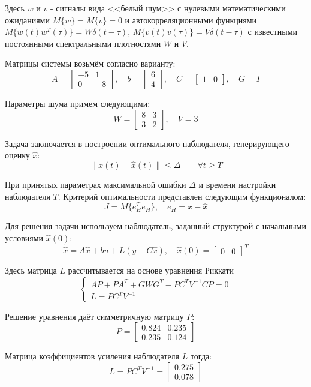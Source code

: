 \documentclass[a4paper,hidelinks,14pt]{extarticle}
\begin{document}
	Здесь $w$ и $v$ - сигналы вида <<белый шум>> с нулевыми математическими ожиданиями $M\{w\}=M\{v\}=0$ и автокорреляционными функциями $M\{w(t)w^T(\tau)\}=W\delta(t-\tau)$, $M\{v(t)v(\tau)\}=V\delta(t-\tau)$ с известными постоянными спектральными плотностями $W$ и $V$.

	Матрицы системы возьмём согласно варианту:
	\[
		A = \begin{bmatrix}
			-5 & 1 \\
			0 & -8
		\end{bmatrix}, \quad
		b = \begin{bmatrix}
			6 \\
			4
		\end{bmatrix}, \quad C = \begin{bmatrix}
			1 & 0
		\end{bmatrix}, \quad G = I
	\]

	Параметры шума примем следующими:
	\[
		W = \begin{bmatrix}
			8 & 3 \\
			3 & 2
		\end{bmatrix}, \quad V = 3
	\]

	Задача заключается в построении оптимального наблюдателя, генерирующего оценку $\hat{x}$:
	\[
	\|x(t) - \hat{x}(t)\| \le \Delta \qquad \forall t \ge T
	\]
	
	При принятых параметрах максимальной ошибки $\Delta$ и времени настройки наблюдателя $T$. Критерий оптимальности представлен следующим функционалом:
	\[
	J = M\{e_H^T e_H\}, \quad e_H = x - \hat{x}
	\]

	Для решения задачи используем наблюдатель, заданный структурой с начальными условиями $\hat{x}(0)$:
	\[
	\dot{\hat{x}} = A\hat{x} + bu + L(y - C\hat{x}), \quad \hat{x}(0) = \begin{bmatrix}
		0 & 0
	\end{bmatrix}^T
	\]

	Здесь матрица $L$ рассчитывается на основе уравнения Риккати
	\[
		\begin{cases}
			AP + PA^T + GWG^T - PC^TV^{-1}CP = 0 \\
			L = PC^TV^{-1}
		\end{cases}
	\]

	Решение уравнения даёт симметричную матрицу $P$:
	\[
		P = \begin{bmatrix}
			0.824 & 0.235 \\
			0.235 & 0.124
		\end{bmatrix}
	\]

	Матрица коэффициентов усиления наблюдателя $L$ тогда:
	\[
		L = P C^T V^{-1} = \begin{bmatrix}
			0.275 \\
			0.078
		\end{bmatrix}
	\]
\end{document}
